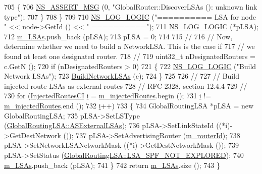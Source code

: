\begin{DoxyCode}
705         \{
706           \hyperlink{assert_8h_aff5ece9066c74e681e74999856f08539}{NS\_ASSERT\_MSG} (0, \textcolor{stringliteral}{"GlobalRouter::DiscoverLSAs (): unknown link type"});
707         \}
708     \}
709 
710   \hyperlink{group__logging_ga88acd260151caf2db9c0fc84997f45ce}{NS\_LOG\_LOGIC} (\textcolor{stringliteral}{"========== LSA for node "} << node->GetId () << \textcolor{stringliteral}{" =========="});
711   \hyperlink{group__logging_ga88acd260151caf2db9c0fc84997f45ce}{NS\_LOG\_LOGIC} (*pLSA);
712   \hyperlink{classns3_1_1GlobalRouter_a5c583d84f810ce4404f54450a0ac18d4}{m\_LSAs}.push\_back (pLSA);
713   pLSA = 0;
714 
715   \textcolor{comment}{// }
716   \textcolor{comment}{// Now, determine whether we need to build a NetworkLSA.  This is the case if}
717   \textcolor{comment}{// we found at least one designated router.}
718   \textcolor{comment}{//}
719   uint32\_t nDesignatedRouters = c.GetN ();
720   \textcolor{keywordflow}{if} (nDesignatedRouters > 0)
721     \{
722       \hyperlink{group__logging_ga88acd260151caf2db9c0fc84997f45ce}{NS\_LOG\_LOGIC} (\textcolor{stringliteral}{"Build Network LSAs"});
723       \hyperlink{classns3_1_1GlobalRouter_aff937ae50e8cc2de5a6e989cbe17609b}{BuildNetworkLSAs} (c);
724     \}
725 
726   \textcolor{comment}{//}
727   \textcolor{comment}{// Build injected route LSAs as external routes}
728   \textcolor{comment}{// RFC 2328, section 12.4.4}
729   \textcolor{comment}{//}
730   \textcolor{keywordflow}{for} (\hyperlink{classns3_1_1GlobalRouter_aea87fa6405b7c0e2bd56adfcf37823a8}{InjectedRoutesCI} \hyperlink{bernuolliDistribution_8m_a6f6ccfcf58b31cb6412107d9d5281426}{i} = \hyperlink{classns3_1_1GlobalRouter_a2d1dd8dbb1bc813f24bff2fb2f0cde7f}{m\_injectedRoutes}.begin ();
731        \hyperlink{bernuolliDistribution_8m_a6f6ccfcf58b31cb6412107d9d5281426}{i} != \hyperlink{classns3_1_1GlobalRouter_a2d1dd8dbb1bc813f24bff2fb2f0cde7f}{m\_injectedRoutes}.end ();
732        \hyperlink{bernuolliDistribution_8m_a6f6ccfcf58b31cb6412107d9d5281426}{i}++)
733     \{
734       GlobalRoutingLSA *pLSA = \textcolor{keyword}{new} GlobalRoutingLSA;
735       pLSA->SetLSType (\hyperlink{classns3_1_1GlobalRoutingLSA_a34eb53a1ed37c877923b74d671224fdea695b98ad474baaa5f11ff5bb06048ec7}{GlobalRoutingLSA::ASExternalLSAs});
736       pLSA->SetLinkStateId ((*i)->GetDestNetwork ());
737       pLSA->SetAdvertisingRouter (\hyperlink{classns3_1_1GlobalRouter_aa107123583f6b2b68c61666a029b4270}{m\_routerId});
738       pLSA->SetNetworkLSANetworkMask ((*i)->GetDestNetworkMask ());
739       pLSA->SetStatus (\hyperlink{classns3_1_1GlobalRoutingLSA_a18bf63da580856fe1cc158aa855af1bda0d9a91161488cead75d479293fd05a94}{GlobalRoutingLSA::LSA\_SPF\_NOT\_EXPLORED});
740       \hyperlink{classns3_1_1GlobalRouter_a5c583d84f810ce4404f54450a0ac18d4}{m\_LSAs}.push\_back (pLSA); 
741     \}
742   \textcolor{keywordflow}{return} \hyperlink{classns3_1_1GlobalRouter_a5c583d84f810ce4404f54450a0ac18d4}{m\_LSAs}.size ();
743 \}
\end{DoxyCode}



